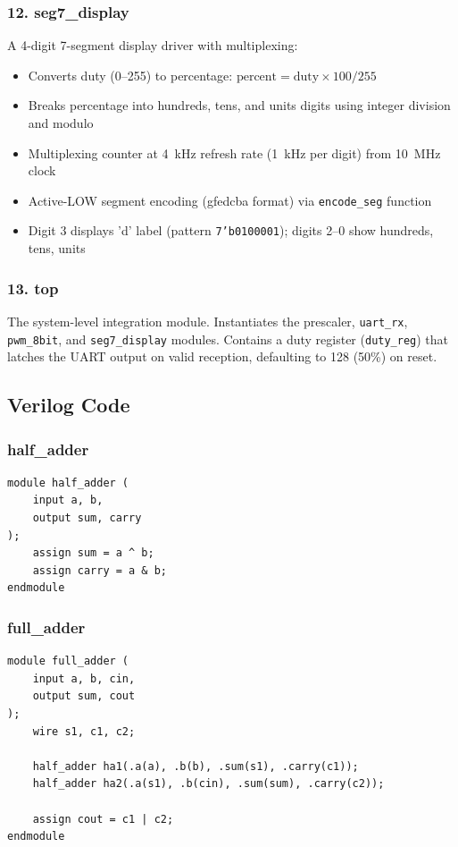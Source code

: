 \documentclass[12pt,a4paper]{article}
\begin{document}
\subsubsection*{12. seg7\_display}
A 4-digit 7-segment display driver with multiplexing:
\begin{itemize}
\item Converts duty (0--255) to percentage: $\text{percent} = \text{duty} \times 100 / 255$
\item Breaks percentage into hundreds, tens, and units digits using integer division and modulo
\item Multiplexing counter at 4~kHz refresh rate (1~kHz per digit) from 10~MHz clock
\item Active-LOW segment encoding (gfedcba format) via \texttt{encode\_seg} function
\item Digit 3 displays 'd' label (pattern \texttt{7'b0100001}); digits 2--0 show hundreds, tens, units
\end{itemize}

\subsubsection*{13. top}
The system-level integration module. Instantiates the prescaler, \texttt{uart\_rx}, \texttt{pwm\_8bit}, and \texttt{seg7\_display} modules. Contains a duty register (\texttt{duty\_reg}) that latches the UART output on valid reception, defaulting to 128 (50\%) on reset.

\subsection{Verilog Code}

\subsubsection*{half\_adder}
\begin{lstlisting}
module half_adder (
    input a, b,
    output sum, carry
);
    assign sum = a ^ b;
    assign carry = a & b;
endmodule
\end{lstlisting}

\subsubsection*{full\_adder}
\begin{lstlisting}
module full_adder (
    input a, b, cin,
    output sum, cout 
);
    wire s1, c1, c2;

    half_adder ha1(.a(a), .b(b), .sum(s1), .carry(c1));
    half_adder ha2(.a(s1), .b(cin), .sum(sum), .carry(c2));

    assign cout = c1 | c2;
endmodule
\end{lstlisting}
\end{document}
